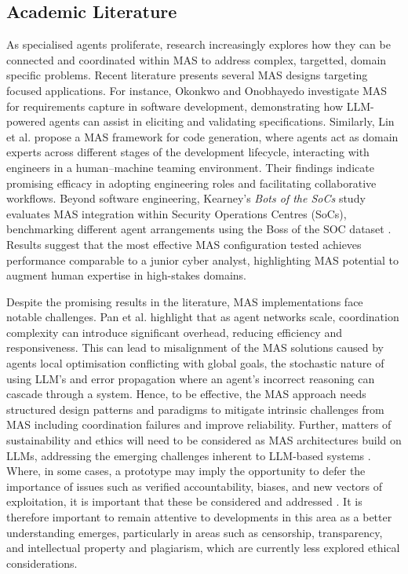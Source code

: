 \documentclass{article}
\begin{document}
\subsection{Academic Literature}

As specialised agents proliferate, research increasingly explores how they can be connected and coordinated within MAS to address complex, targetted, domain specific problems. Recent literature presents several MAS designs targeting focused applications. For instance, Okonkwo and Onobhayedo \cite{jai.2024.058649} investigate MAS for requirements capture in software development, demonstrating how LLM-powered agents can assist in eliciting and validating specifications. Similarly, Lin et al. \cite{lin2024llm} propose a MAS framework for code generation, where agents act as domain experts across different stages of the development lifecycle, interacting with engineers in a human–machine teaming environment. Their findings indicate promising efficacy in adopting engineering roles and facilitating collaborative workflows. Beyond software engineering, Kearney’s \emph{Bots of the SoCs} study \cite{kearney2024bots} evaluates MAS integration within Security Operations Centres (SoCs), benchmarking different agent arrangements using the Boss of the SOC dataset \cite{splunkgh2023BotS}. Results suggest that the most effective MAS configuration tested achieves performance comparable to a junior cyber analyst, highlighting MAS potential to augment human expertise in high-stakes domains.

Despite the promising results in the literature, MAS implementations face notable challenges. Pan et al. \cite{pan2025multiagent} highlight that as agent networks scale, coordination complexity can introduce significant overhead, reducing efficiency and responsiveness. This can lead to misalignment of the MAS solutions caused by agents local optimisation conflicting with global goals, the stochastic nature of using LLM's and error propagation where an agent's incorrect reasoning can cascade through a system. Hence, to be effective, the MAS approach needs structured design patterns and paradigms to mitigate intrinsic challenges from MAS including coordination failures and improve reliability. Further, matters of sustainability and ethics will need to be considered as MAS architectures build on LLMs, addressing the emerging challenges inherent to LLM-based systems \cite{ding_sustainable_2024, hinds_our_2023, kapania_im_2025}. Where, in some cases, a prototype may imply the opportunity to defer the importance of issues such as verified accountability, biases, and new vectors of exploitation, it is important that these be considered and addressed \cite{jiao_navigating_2025}. It is therefore important to remain attentive to developments in this area as a better understanding emerges, particularly in areas such as censorship, transparency, and intellectual property and plagiarism, which are currently less explored ethical considerations.
\end{document}
